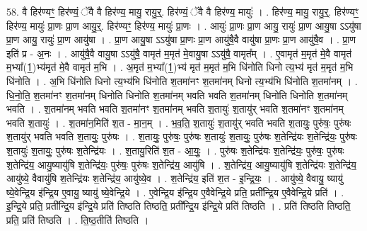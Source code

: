 \documentclass[17pt]{extarticle}
\begin{document}
58. वै हिर॑ण्यꣳ॒॒ हिर॑ण्यं॒ ॅवै वै हिर॑ण्य॒ मायु॒ रायु॒र्॒. हिर॑ण्यं॒ ॅवै वै हिर॑ण्य॒ मायुः॑ । . हिर॑ण्य॒ मायु॒ रायु॒र्॒. हिर॑ण्यꣳ॒॒ हिर॑ण्य॒ मायुः॑ प्रा॒णः प्रा॒ण आयु॒र्॒. हिर॑ण्यꣳ॒॒ हिर॑ण्य॒ मायुः॑ प्रा॒णः । . आयुः॑ प्रा॒णः प्रा॒ण आयु॒ रायुः॑ प्रा॒ण आयु॒षा ऽऽयु॑षा प्रा॒ण आयु॒ रायुः॑ प्रा॒ण आयु॑षा । . प्रा॒ण आयु॒षा ऽऽयु॑षा प्रा॒णः प्रा॒ण आयु॑षै॒वै वायु॑षा प्रा॒णः प्रा॒ण आयु॑षै॒व । . प्रा॒ण इति॑ प्र - अ॒नः । . आयु॑षै॒वै वायु॒षा ऽऽयु॑षै॒ वामृत॑ म॒मृत॑ मे॒वायु॒षा ऽऽयु॑षै॒ वामृत᳚म् । . ए॒वामृत॑ म॒मृत॑ मे॒वै वामृत॑ म॒भ्या᳚(1॒)भ्य॑मृत॑ मे॒वै वामृत॑ म॒भि । . अ॒मृत॑ म॒भ्या᳚(1॒)भ्य॑ मृत॑ म॒मृत॑ म॒भि धि॑नोति धिनो त्य॒भ्य॑ मृत॑ म॒मृत॑ म॒भि धि॑नोति । . अ॒भि धि॑नोति धिनो त्य॒भ्य॑भि धि॑नोति श॒तमा॑नꣳ श॒तमा॑नम् धिनो त्य॒भ्य॑भि धि॑नोति श॒तमा॑नम् । . धि॒नो॒ति॒ श॒तमा॑नꣳ श॒तमा॑नम् धिनोति धिनोति श॒तमा॑नम् भवति भवति श॒तमा॑नम् धिनोति धिनोति श॒तमा॑नम् भवति । . श॒तमा॑नम् भवति भवति श॒तमा॑नꣳ श॒तमा॑नम् भवति श॒तायुः॑ श॒तायु॑र् भवति श॒तमा॑नꣳ श॒तमा॑नम् भवति श॒तायुः॑ । . श॒तमा॑न॒मिति॑ श॒त - मा॒न॒म् । . भ॒व॒ति॒ श॒तायुः॑ श॒तायु॑र् भवति भवति श॒तायुः॒ पुरु॑षः॒ पुरु॑षः श॒तायु॑र् भवति भवति श॒तायुः॒ पुरु॑षः । . श॒तायुः॒ पुरु॑षः॒ पुरु॑षः श॒तायुः॑ श॒तायुः॒ पुरु॑षः श॒तेन्द्रि॑यः श॒तेन्द्रि॑यः॒ पुरु॑षः श॒तायुः॑ श॒तायुः॒ पुरु॑षः श॒तेन्द्रि॑यः । . श॒तायु॒रिति॑ श॒त - आ॒युः॒ । . पुरु॑षः श॒तेन्द्रि॑यः श॒तेन्द्रि॑यः॒ पुरु॑षः॒ पुरु॑षः श॒तेन्द्रि॑य॒ आयु॒ष्यायु॑षि श॒तेन्द्रि॑यः॒ पुरु॑षः॒ पुरु॑षः श॒तेन्द्रि॑य॒ आयु॑षि । . श॒तेन्द्रि॑य॒ आयु॒ष्यायु॑षि श॒तेन्द्रि॑यः श॒तेन्द्रि॑य॒ आयु॑ष्ये॒ वैवायु॑षि श॒तेन्द्रि॑यः श॒तेन्द्रि॑य॒ आयु॑ष्ये॒व । . श॒तेन्द्रि॑य॒ इति॑ श॒त - इ॒न्द्रि॒यः॒ । . आयु॑ष्ये॒ वैवायु॒ ष्यायु॑ ष्ये॒वेन्द्रि॒य इ॑न्द्रि॒य ए॒वायु॒ ष्यायु॑ ष्ये॒वेन्द्रि॒ये । . ए॒वेन्द्रि॒य इ॑न्द्रि॒य ए॒वैवेन्द्रि॒ये प्रति॒ प्रती᳚न्द्रि॒य ए॒वैवेन्द्रि॒ये प्रति॑ । . इ॒न्द्रि॒ये प्रति॒ प्रती᳚न्द्रि॒य इ॑न्द्रि॒ये प्रति॑ तिष्ठति तिष्ठति॒ प्रती᳚न्द्रि॒य इ॑न्द्रि॒ये प्रति॑ तिष्ठति । . प्रति॑ तिष्ठति तिष्ठति॒ प्रति॒ प्रति॑ तिष्ठति । . ति॒ष्ठ॒तीति॑ तिष्ठति । \newline
\pagebreak
{}
\end{document}
